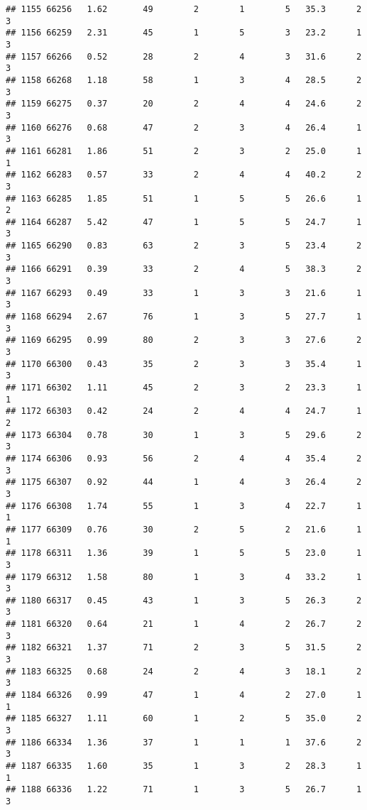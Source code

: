 \documentclass[
]{article}
\begin{document}
\begin{verbatim}
## 1155 66256   1.62       49        2        1        5   35.3      2      3
## 1156 66259   2.31       45        1        5        3   23.2      1      3
## 1157 66266   0.52       28        2        4        3   31.6      2      3
## 1158 66268   1.18       58        1        3        4   28.5      2      3
## 1159 66275   0.37       20        2        4        4   24.6      2      3
## 1160 66276   0.68       47        2        3        4   26.4      1      3
## 1161 66281   1.86       51        2        3        2   25.0      1      1
## 1162 66283   0.57       33        2        4        4   40.2      2      3
## 1163 66285   1.85       51        1        5        5   26.6      1      2
## 1164 66287   5.42       47        1        5        5   24.7      1      3
## 1165 66290   0.83       63        2        3        5   23.4      2      3
## 1166 66291   0.39       33        2        4        5   38.3      2      3
## 1167 66293   0.49       33        1        3        3   21.6      1      3
## 1168 66294   2.67       76        1        3        5   27.7      1      3
## 1169 66295   0.99       80        2        3        3   27.6      2      3
## 1170 66300   0.43       35        2        3        3   35.4      1      3
## 1171 66302   1.11       45        2        3        2   23.3      1      1
## 1172 66303   0.42       24        2        4        4   24.7      1      2
## 1173 66304   0.78       30        1        3        5   29.6      2      3
## 1174 66306   0.93       56        2        4        4   35.4      2      3
## 1175 66307   0.92       44        1        4        3   26.4      2      3
## 1176 66308   1.74       55        1        3        4   22.7      1      1
## 1177 66309   0.76       30        2        5        2   21.6      1      1
## 1178 66311   1.36       39        1        5        5   23.0      1      3
## 1179 66312   1.58       80        1        3        4   33.2      1      3
## 1180 66317   0.45       43        1        3        5   26.3      2      3
## 1181 66320   0.64       21        1        4        2   26.7      2      3
## 1182 66321   1.37       71        2        3        5   31.5      2      3
## 1183 66325   0.68       24        2        4        3   18.1      2      3
## 1184 66326   0.99       47        1        4        2   27.0      1      1
## 1185 66327   1.11       60        1        2        5   35.0      2      3
## 1186 66334   1.36       37        1        1        1   37.6      2      3
## 1187 66335   1.60       35        1        3        2   28.3      1      1
## 1188 66336   1.22       71        1        3        5   26.7      1      3

\end{verbatim}
\end{document}
